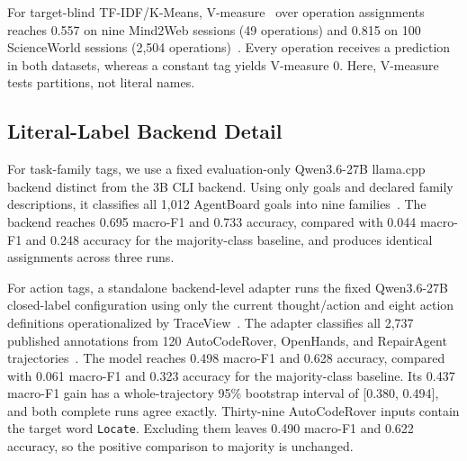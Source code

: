 \documentclass[letterpaper]{article}
\begin{document}
For target-blind TF-IDF/K-Means,
V-measure~\cite{rosenberg-hirschberg-2007-v-measure} over operation assignments
reaches 0.557 on nine Mind2Web sessions (49 operations) and 0.815 on 100
ScienceWorld sessions (2{,}504 operations)~\cite{mind2web,scienceworld}.
Every operation receives a prediction in both datasets, whereas a constant tag
yields V-measure 0. Here, V-measure tests partitions, not literal names.

\subsection{Literal-Label Backend Detail}
\label{app:literal}

For task-family tags, we use a fixed evaluation-only Qwen3.6-27B llama.cpp
backend distinct from the 3B CLI backend. Using only goals and declared family
descriptions, it classifies all 1{,}012 AgentBoard goals into nine
families~\cite{qwen36,agentboard}. The backend reaches 0.695 macro-F1 and 0.733
accuracy, compared with 0.044 macro-F1 and 0.248 accuracy for the majority-class
baseline, and produces identical assignments across three runs.

For action tags, a standalone backend-level adapter runs the fixed Qwen3.6-27B
closed-label configuration using only the current thought/action and eight
action definitions operationalized by TraceView~\cite{qwen36,traceview-2026}.
The adapter classifies all 2{,}737 published annotations from 120 AutoCodeRover,
OpenHands, and RepairAgent trajectories~\cite{bouzenia-pradel-2025-trajectories}.
The model reaches 0.498 macro-F1 and 0.628 accuracy, compared with 0.061
macro-F1 and 0.323 accuracy for the majority-class baseline. Its 0.437 macro-F1 gain has a whole-trajectory 95\% bootstrap
interval of [0.380, 0.494], and both complete runs agree exactly.
Thirty-nine AutoCodeRover inputs contain the target word
\texttt{Locate}. Excluding them leaves 0.490 macro-F1 and 0.622 accuracy, so the
positive comparison to majority is unchanged.
\end{document}
